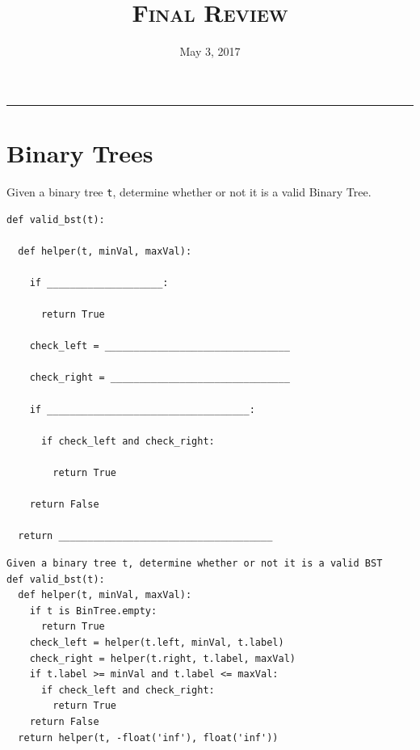 \documentclass{exam}
\title{\textsc{Final Review}}
\date{May 3, 2017}
\begin{document}
\maketitle
\rule{\textwidth}{0.15em}
\fontsize{12}{15}\selectfont




\section{Binary Trees}
\begin{questions}

\item Given a binary tree \texttt{t}, determine whether or not it is a valid Binary Tree.
\newline
\begin{lstlisting}
def valid_bst(t):

  def helper(t, minVal, maxVal):

    if ____________________:

      return True 

    check_left = ________________________________

    check_right = _______________________________

    if ___________________________________: 

      if check_left and check_right:

        return True

    return False

  return _____________________________________
\end{lstlisting}
\begin{solution}
\begin{lstlisting}
Given a binary tree t, determine whether or not it is a valid BST 
def valid_bst(t):
  def helper(t, minVal, maxVal):
    if t is BinTree.empty:
      return True 
    check_left = helper(t.left, minVal, t.label)
    check_right = helper(t.right, t.label, maxVal)
    if t.label >= minVal and t.label <= maxVal:
      if check_left and check_right:
        return True
    return False
  return helper(t, -float('inf'), float('inf'))
\end{lstlisting}
\end{solution}

\clearpage


\end{questions}
\end{document}
